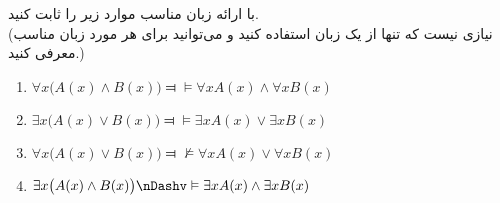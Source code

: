
	با ارائه زبان مناسب موارد زیر را ثابت کنید.\\
	(نیازی نیست که تنها از یک زبان استفاده کنید و می‌توانید برای هر مورد زبان مناسب معرفی کنید.)
	\begin{enumerate}[label = (\alph*]
		\LTR
		\item 
			$\forall x \big(A(x) \wedge B(x)\big) \Dashv\vDash \forall x A(x) \wedge \forall x B(x)$
		\item 
			$\exists x \big(A(x) \vee B(x)\big) \Dashv\vDash \exists x A(x) \vee \exists x B(x)$
		\item
			$\forall x \big(A(x) \vee B(x)\big) \Dashv\nvDash \forall x A(x) \vee \forall x B(x)$
		\item
			$\exists x \big(A(x) \wedge B(x)\big) \nDashv\vDash \exists x A(x) \wedge \exists x B(x)$
	\end{enumerate}
